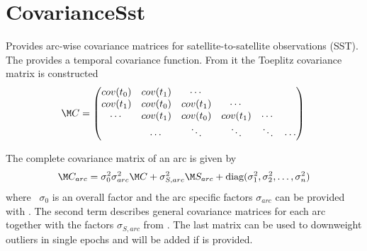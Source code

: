 \section{CovarianceSst}\label{covarianceSstType}
Provides arc-wise covariance matrices for satellite-to-satellite observations (SST).
The  provides a temporal covariance function.
From it the Toeplitz covariance matrix is constructed
\begin{equation}
  \M C = \begin{pmatrix}
    cov(t_0) & cov(t_1) & \cdots   &          &        &        \\
    cov(t_1) & cov(t_0) & cov(t_1) & \cdots   &        &        \\
    \cdots   & cov(t_1) & cov(t_0) & cov(t_1) & \cdots &        \\
             & \cdots   & \ddots   & \ddots   & \ddots & \cdots \\
  \end{pmatrix} \\
\end{equation}

The complete covariance matrix of an arc is given by
\begin{equation}
  \M C_{arc} = \sigma_0^2 \sigma_{arc}^2 \M C + \sigma_{S,arc}^2 \M S_{arc}+ \text{diag}(\sigma_1^2, \sigma_2^2, \ldots, \sigma_n^2)
\end{equation}
where ~$\sigma_0$ is an overall factor and the arc specific factors $\sigma_{arc}$
can be provided with .
The second term describes general covariance matrices for each arc
 together with the factors $\sigma_{S,arc}$ from .
The last matrix can be used to downweight outliers in single epochs and will be added if
 is provided.



